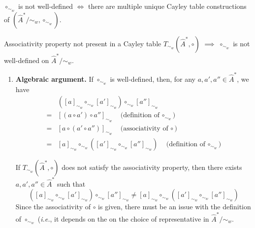 \begin{corollary}
    $\circ_{\sim_{w}}$ is not well-defined $\iff$ there are multiple unique Cayley table constructions of $(\hat{A}^{*}/\sim_{w}, \circ_{\sim_{w}})$.
\end{corollary}


\begin{propositionE}
    Associativity property not present in a Cayley table $T_{\sim_{w}}(\hat{A}^{*}, \circ)$ $\implies$ $\circ_{\sim_{w}}$ is not well-defined on $\hat{A}^{*}/\sim_{w}$.
\end{propositionE}
\begin{proofE}
\begin{enumerate}
    \item \textbf{Algebraic argument.}
    If $\circ_{\sim_{w}}$ is well-defined, then, for any $a, a', a'' \in \hat{A}^{*}$, we have
    \begin{align}
          & ([a]_{\sim_{w}} \circ_{\sim_{w}} [a']_{\sim_{w}}) \circ_{\sim_{w}} [a'']_{\sim_{w}} \\
        = & [(a \circ a') \circ a'']_{\sim_{w}} \quad \text{(definition of $\circ_{\sim_{w}}$}) \\
        = & [a \circ (a' \circ a'')]_{\sim_{w}} \quad \text{(associativity of $\circ$}) \\
        = & [a]_{\sim_{w}} \circ_{\sim_{w}} ([a']_{\sim_{w}} \circ_{\sim_{w}} [a'']_{\sim_{w}}) \quad \text{(definition of $\circ_{\sim_{w}}$})
    \end{align}

    If $T_{\sim_{w}}(\hat{A}^{*}, \circ)$ does not satisfy the associativity property, then there exists $a, a', a'' \in \hat{A}^{*}$ such that
    \begin{equation}
        ([a]_{\sim_{w}} \circ_{\sim_{w}} [a']_{\sim_{w}}) \circ_{\sim_{w}} [a'']_{\sim_{w}} \neq [a]_{\sim_{w}} \circ_{\sim_{w}} ([a']_{\sim_{w}} \circ_{\sim_{w}} [a'']_{\sim_{w}})
    \end{equation}
    Since the associativity of $\circ$ is given, there must be an issue with the definition of $\circ_{\sim_{w}}$ (\textit{i.e.}, it depends on the on the choice of representative in $\hat{A}^{*}/\sim_{w}$.
    

\end{enumerate}
\end{proofE}
